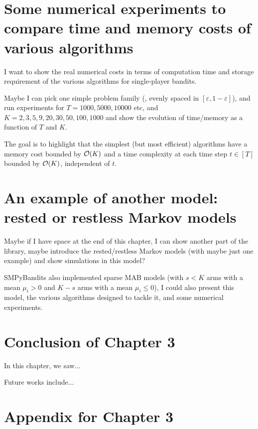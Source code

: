 \section{Some numerical experiments to compare time and memory costs of various algorithms}
\label{sec:3:timeAndMemoryCosts}

I want to show the real numerical costs in terms of computation time and storage requirement of the various algorithms for single-player bandits.

Maybe I can pick one simple problem family (\eg, evenly spaced in $[\varepsilon,1-\varepsilon]$), and run experiments for $T=1000,5000,10000$ etc, and $K=2,3,5,9,20,30,50,100,1000$ and show the evolution of time/memory as a function of $T$ and $K$.

The goal is to highlight that the simplest (but most efficient) algorithms have a memory cost bounded by $\mathop{}\mathopen{}\mathcal{O}\mathopen{}\left(K\right)$ and a time complexity at each time step $t\in[T]$ bounded by $\mathop{}\mathopen{}\mathcal{O}\mathopen{}\left(K\right)$, independent of $t$.


\section{An example of another model: rested or restless Markov models}
\label{sec:3:markovModels}

Maybe if I have space at the end of this chapter, I can show another part of the library, maybe introduce the rested/restless Markov models (with maybe just one example) and show simulations in this model?

SMPyBandits also implemented sparse MAB models (with $s<K$ arms with a mean $\mu_i>0$ and $K-s$ arms with a mean $\mu_i \leq 0$), I could also present this model, the various algorithms designed to tackle it, and some numerical experiments.


\section{Conclusion of Chapter 3}
\label{sec:3:conclusion}

In this chapter, we saw...

Future works include...




\section{Appendix for Chapter 3}
\label{sec:3:appendix}

